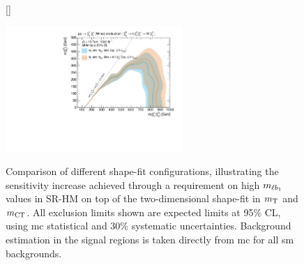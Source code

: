 \begin{figure}[h]
[\FBwidth]
{\caption{Comparison of different shape-fit configurations, illustrating the sensitivity increase achieved through a requirement on high $m_{\ell b_{1}}$ values in SR-HM on top of the two-dimensional shape-fit in $m_{\textrm{T}}$ and $m_{\textrm{CT}}$. All exclusion limits shown are expected limits at 95\% CL, using \gls{mc} statistical and 30\% systematic uncertainties. Background estimation in the signal regions is taken directly from \gls{mc} for all \gls{sm} backgrounds.}
\label{fig:plot_mlb1_cls}}
{\includegraphics[width=0.60\textwidth]{HF/plot_mlb1}}
\end{figure}
%
%

\FloatBarrier

